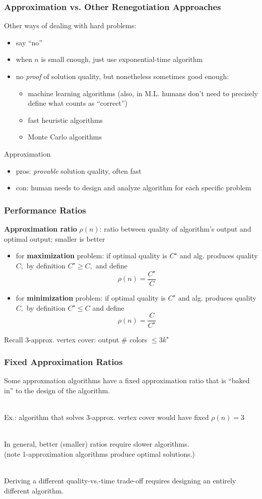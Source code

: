\documentclass{beamer}
\newcommand{\stanza}{ \\~\ }
\begin{document}
\begin{frame} \frametitle{Approximation vs. Other Renegotiation Approaches}
Other ways of dealing with hard problems:
\begin{itemize}
  \item say ``no''
  \item when $n$ is small enough, just use exponential-time algorithm
  \item no \emph{proof} of solution quality, but nonetheless sometimes good enough:
    \begin{itemize}
      \item machine learning algorithms (also, in M.L. humans don't need to precisely define what counts as ``correct'')
      \item fast heuristic algorithms
      \item Monte Carlo algorithms
    \end{itemize}
\end{itemize}

Approximation
\begin{itemize}
  \item pros: \emph{provable} solution quality, often fast
  \item con: human needs to design and analyze algorithm for each specific problem
\end{itemize}
\end{frame}

\begin{frame} \frametitle{Performance Ratios}
\textbf{Approximation ratio} $\rho(n)$: ratio between quality of algorithm's output
and optimal output; smaller is better
\begin{itemize}
  \item for \textbf{maximization} problem: if optimal quality is $C^\star$ and alg. produces
    quality $C,$ by definition $C^\star \geq C,$ and define
    \[ \rho(n) = \frac{C^\star}{C} \]
  \item for \textbf{minimization} problem: if optimal quality is $C^\star$ and alg. produces
    quality $C,$ by definition $C^\star \leq C$ and define
    \[ \rho(n) = \frac{C}{C^\star} \]
\end{itemize}
Recall 3-approx. vertex cover: output \# colors $\leq 3 k^\star$
\end{frame}

\begin{frame} \frametitle{Fixed Approximation Ratios}
Some approxmation algorithms have a fixed approximation ratio that is
``baked in'' to the design of the algorithm. \stanza

Ex.: algorithm that solves 3-approx. vertex cover would have fixed $\rho(n)=3$
\stanza

In general, better (smaller) ratios require slower algorithms. \\
(note 1-approximation algorithms produce optimal solutions.) \stanza

Deriving a different quality-vs.-time trade-off requires designing an
entirely different algorithm.
\end{frame}
\end{document}
